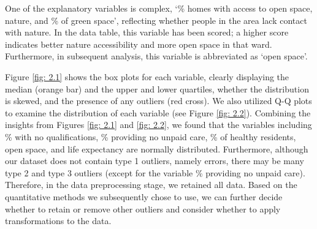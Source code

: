 \documentclass[a4paper,12pt]{article}
\begin{document}
One of the explanatory variables is complex, `\% homes with access to open space, nature, and \% of green space', reflecting whether people in the area lack contact with nature. In the data table, this variable has been scored; a higher score indicates better nature accessibility and more open space in that ward. Furthermore, in subsequent analysis, this variable is abbreviated as `open space'.

Figure \ref{fig: 2.1} shows the box plots for each variable, clearly displaying the median (orange bar) and the upper and lower quartiles, whether the distribution is skewed, and the presence of any outliers (red cross). We also utilized Q-Q plots to examine the distribution of each variable (see Figure \ref{fig: 2.2}). Combining the insights from Figures \ref{fig: 2.1} and \ref{fig: 2.2}, we found that the variables including \% with no qualifications, \% providing no unpaid care, \% of healthy residents, open space, and life expectancy are normally distributed. Furthermore, although our dataset does not contain type 1 outliers, namely errors, there may be many type 2 and type 3 outliers (except for the variable \% providing no unpaid care). Therefore, in the data preprocessing stage, we retained all data. Based on the quantitative methods we subsequently chose to use, we can further decide whether to retain or remove other outliers and consider whether to apply transformations to the data.
\end{document}
